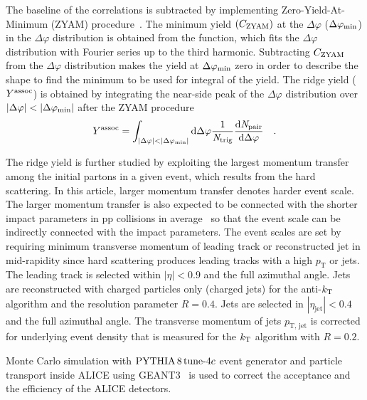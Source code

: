 The baseline of the correlations is subtracted by implementing Zero-Yield-At-Minimum (ZYAM) procedure~\cite{Ajitanand:2005jj}. The minimum yield $(C_{\rm{ZYAM}})$ at the $\Delta\varphi$ ($\Delta\varphi_{\rm{min}}$) in the $\Delta\varphi$ distribution is obtained from the function, which fits the $\Delta\varphi$ distribution with Fourier series up to the third harmonic. Subtracting $C_{\rm{ZYAM}}$ from the $\Delta\varphi$ distribution makes the yield at $\Delta\varphi_{\rm{min}}$ zero in order to describe the shape to find the minimum to be used for integral of the yield. The ridge yield ($Y^{\rm{assoc}}$) is obtained by integrating the near-side peak of the $\Delta\varphi$ distribution over $|\Delta\varphi|<|\Delta\varphi_{\rm{min}}|$ after the ZYAM procedure
\begin{eqnarray}
Y^{\rm{assoc}} = \int_{|\Delta \varphi| < |\Delta\varphi_{\rm{min}}| } \rm{d} \Delta\varphi \frac{1}{\it{N}_{\rm{trig}}} \frac{ \rm{d}\it{}N_{\rm{pair}} }{ \rm{d}\Delta\varphi } \quad.
\end{eqnarray}

The ridge yield is further studied by exploiting the largest momentum transfer among the initial partons in a given event, which results from the hard scattering. In this article, larger momentum transfer denotes harder event scale. The larger momentum transfer is also expected to be connected with the shorter impact parameters in pp collisions in average~\cite{Sjostrand:1986ep,Frankfurt:2010ea} so that the event scale can be indirectly connected with the impact parameters.
The event scales are set by requiring minimum transverse momentum of leading track or reconstructed jet in mid-rapidity since hard scattering produces leading tracks with a high $p_\mathrm{T}$ or jets. The leading track is selected within $|\eta|<0.9$ and the full azimuthal angle. Jets are reconstructed with charged particles only (charged jets) for the anti-$k_{\rm{T}}$ algorithm and the resolution parameter $R = 0.4$. Jets are selected in $|\eta_\mathrm{jet}|<0.4$ and the full azimuthal angle. The transverse momentum of jets $p_\mathrm{T,\,jet}$ is corrected for underlying event density that is measured for the $k_{\rm{T}}$ algorithm with $R = 0.2$. 

Monte Carlo simulation with $\mathrm{PYTHIA}\,8\,\mathrm{tune}{\text -}4c$ event generator and particle transport inside ALICE using GEANT3~\cite{Brun:1994aa} is used to correct the acceptance and the efficiency of the ALICE detectors. 

